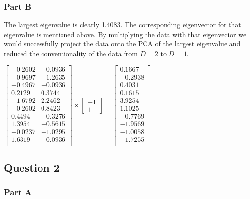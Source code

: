 \documentclass[12pt]{article}
\begin{document}
\subsubsection{Part B}
The largest eigenvalue is clearly 1.4083. The corresponding eigenvector for that eigenvalue is mentioned above. By multiplying the data with that eigenvector we would successfully project the data onto the PCA of the largest eigenvalue and reduced the conventionality of the data from $D=2$ to $D=1$.
\begin{center}

$\begin{bmatrix}
-0.2602 & -0.0936\\
-0.9697 & -1.2635\\
-0.4967 & -0.0936\\
0.2129 & 0.3744\\
-1.6792 & 2.2462\\
-0.2602 & 0.8423\\
0.4494 & -0.3276\\
1.3954 & -0.5615\\
-0.0237 & -1.0295\\
1.6319 & -0.0936\\
\end{bmatrix}
\times
\begin{bmatrix}
-1 \\
1
\end{bmatrix}
=
\begin{bmatrix}
0.1667\\
-0.2938\\
0.4031\\
0.1615\\
3.9254\\
1.1025\\
-0.7769\\
-1.9569\\
-1.0058\\
-1.7255\\
\end{bmatrix}
$

\end{center}

\subsection{Question 2}
\subsubsection{Part A}
\end{document}
